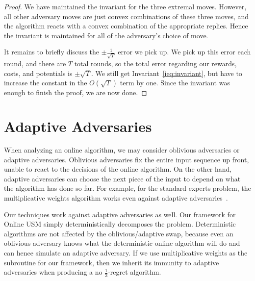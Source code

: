 \documentclass[final,12pt]{colt2018}
\newcommand{\OnlineUSM}{Online USM}
\begin{document}
\begin{proof}
  We have maintained the invariant for the three extremal moves. However, all other adversary moves are just convex combinations of these three moves, and the algorithm reacts with a convex combination of the appropriate replies. Hence the invariant is maintained for all of the adversary's choice of move.
  
  It remains to briefly discuss the $\pm \frac{1}{\sqrt{T}}$ error we pick up. We pick up this error each round, and there are $T$ total rounds, so the total error regarding our rewards, costs, and potentials is $\pm \sqrt{T}$. We still get Invariant~\ref{ieq:invariant}, but have to increase the constant in the $O(\sqrt{T})$ term by one. Since the invariant was enough to finish the proof, we are now done.
\end{proof}

\section{Adaptive Adversaries}\label{a:adaptive}

When analyzing an online algorithm, we may consider oblivious adversaries or adaptive adversaries. Oblivious adversaries fix the entire input sequence up front, unable to react to the decisions of the online algorithm. On the other hand, adaptive adversaries can choose the next piece of the input to depend on what the algorithm has done so far. For example, for the standard experts problem, the multiplicative weights algorithm works even against adaptive adversaries~\citep{KV05}.

Our techniques work against adaptive adversaries as well. Our framework for \OnlineUSM{} simply deterministically decomposes the problem. Deterministic algorithms are not affected by the oblivious/adaptive swap, because even an oblivious adversary knows what the deterministic online algorithm will do and can hence simulate an adaptive adversary. If we use multiplicative weights as the subroutine for our framework, then we inherit its immunity to adaptive adversaries when producing a no $\frac13$-regret algorithm.
\end{document}
